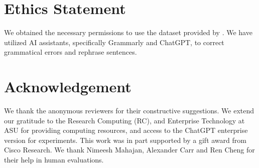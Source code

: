 \section*{Ethics Statement}
 We obtained the necessary permissions to use the dataset provided by \citet{bongard2022legalargumentreasoningtask}. We have utilized AI assistants, specifically Grammarly and ChatGPT, to correct grammatical errors and rephrase sentences.

\section*{Acknowledgement}

We thank the anonymous reviewers for their constructive suggestions. We extend our gratitude to the Research Computing (RC), and Enterprise Technology at ASU for providing computing resources, and access to the ChatGPT enterprise version for experiments. This work was in part supported by a gift award from Cisco Research. We thank Nimeesh Mahajan, Alexander Carr and Ren Cheng for their help in human evaluations.